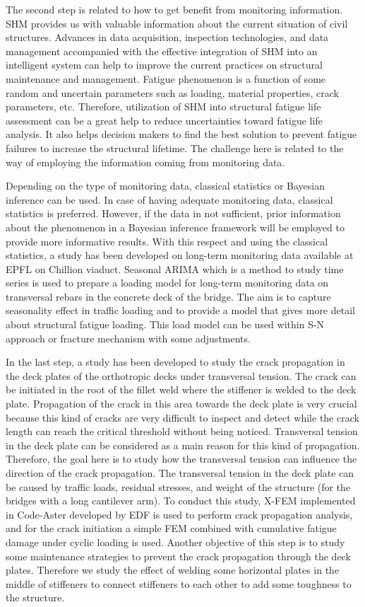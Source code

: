 The second step is related to how to get benefit from monitoring information. \ac{SHM} provides us with valuable information about the current situation of civil structures. 
Advances in data acquisition, inspection technologies, and data management accompanied with the effective integration of \ac{SHM} into an intelligent system can help to improve the current practices 
on structural maintenance and management. Fatigue phenomenon is a function of some random and uncertain parameters such as loading, material properties, crack parameters, etc. Therefore, 
utilization of \ac{SHM} into structural fatigue life assessment can be a great help to reduce uncertainties toward fatigue life analysis. It also helps decision makers to find the best solution to 
prevent fatigue failures to increase the structural lifetime. The challenge here is related to the way of employing the information coming from monitoring data. 


Depending on the type of monitoring data, classical statistics or Bayesian inference can be used. In case of having adequate monitoring data, classical statistics is preferred. However, if the 
data in not sufficient, prior information about the phenomenon in a Bayesian inference framework will be employed to provide more informative results. With this respect and using the classical 
statistics, a study has been developed on long-term monitoring data available at \ac{EPFL} on Chillion viaduct. Seasonal ARIMA which is a method to study 
time series is used to prepare a loading model for long-term monitoring data on transversal rebars in the concrete deck of the bridge. The aim is to capture seasonality effect in traffic 
loading and to provide a model that gives more detail about structural fatigue loading. This load model can be used within S-N approach or fracture mechanism with some adjustments.


In the last step, a study has been developed to study the crack propagation in the deck plates of the orthotropic decks under transversal tension. The crack can be initiated in the root of 
the fillet weld where the stiffener is welded to the deck plate. Propagation of the crack in this area towards the deck plate is very crucial because this kind of cracks are very difficult 
to inspect and detect while the crack length can reach the critical threshold without being noticed. Transversal tension in the deck plate can be considered as a main reason for this kind of 
propagation. Therefore, the goal here is to study how the transversal tension can influence the direction of the crack propagation. The transversal tension in the deck plate can be caused 
by traffic loads, residual stresses, and weight of the structure (for the bridges with a long cantilever arm). To conduct this study, \ac{X-FEM} implemented in Code-Aster developed by \ac{EDF} 
is used to perform crack propagation analysis, and for the crack initiation a simple \ac{FEM} combined with cumulative fatigue damage under cyclic loading is used. Another objective of this step 
is to study some maintenance strategies to prevent the crack propagation through the deck plates. Therefore we study the effect of welding some horizontal plates in the middle of stiffeners 
to connect stiffeners to each other to add some toughness to the structure. 


